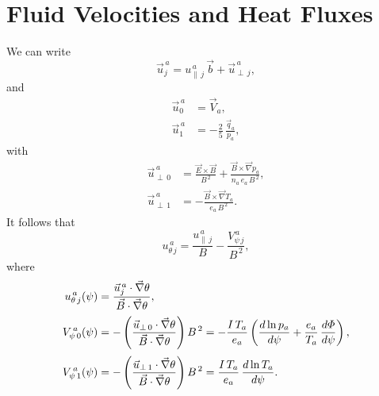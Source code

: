 \documentclass[notitlepage,12pt]{article}
\begin{document}
\section{Fluid Velocities and Heat Fluxes}
We can write
\begin{equation}
\vec{u}_j^{\,a} = u_{\parallel\,j}^{\,a}\,\vec{b} + \vec{u}_{\perp\,j}^{\,a},
\end{equation}
and 
\begin{align}
\vec{u}_0^{\,a} &= \vec{V}_a,\\[0.5ex]
\vec{u}_1^{\,a} &= - \frac{2}{5}\,\frac{\vec{q}_a}{p_a},
\end{align}
with 
\begin{align}
\vec{u}_{\perp\,0}^{\,a} &= \frac{\vec{E}\times \vec{B}}{B^{\,2}} + \frac{\vec{B}\times \vec{\nabla} p_a}{n_a\,e_a\,B^{\,2}},\\[0.5ex]
\vec{u}_{\perp\,1}^{\,a}&= - \frac{\vec{B}\times \vec{\nabla} T_a}{e_a\,B^{\,2}}.
\end{align}
It follows that
\begin{equation}\label{e24x}
u_{\theta\,j}^{\,a} = \frac{u_{\parallel\,j}^{\,a}}{B} - \frac{V_{\psi\,j}^{\,a}}{B^{\,2}},
\end{equation}
where
\begin{align}
u_{\theta\,j}^{\,a}(\psi) &= \frac{\vec{u}_j^{\,a}\cdot\vec{\nabla}\theta}{\vec{B}\cdot\vec{\nabla}\theta},\\[0.5ex]
V_{\psi\,0}^{\,a}(\psi) &=-\left( \frac{\vec{u}_{\perp\,0}\cdot\vec{\nabla}\theta}{\vec{B}\cdot\vec{\nabla}\theta}\right)B^{\,2}=
- \frac{I\,T_a}{e_a}\left(\frac{d \ln p_a}{d\psi}+\frac{e_a}{T_a}\,\frac{d{\mit\Phi}}{d\psi}\right),\\[0.5ex]
V_{\psi\,1}^{\,a}(\psi) &= -\left(\frac{\vec{u}_{\perp\,1}\cdot\vec{\nabla}\theta}{\vec{B}\cdot\vec{\nabla}\theta}\right)B^{\,2}=
\frac{I\,T_a}{e_a}\,\frac{d\ln T_a}{d\psi}.
\end{align}
\end{document}
